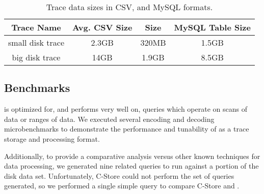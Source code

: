

\begin{table*}[tbh]
\centering
\begin{tabular}{|c|c|c|c|}\hline
Trace Name & Avg. CSV Size & \DataSeries{} Size & MySQL Table Size\\
\hline
small disk trace & 2.3GB & 320MB & 1.5GB\\
big disk trace & 14GB & 1.9GB & 8.5GB \\
\hline
\end{tabular}
\caption{ Trace data sizes in CSV, \DataSeries{} and MySQL formats.}
\label{table:dataSizes}
\end{table*}




\subsection{Benchmarks}\label{sec:perfresults}

\DataSeries{} is optimized for, and performs very well on, queries which
 operate on scans of data or ranges of data.  We executed several
 encoding and decoding microbenchmarks to demonstrate the performance
 and tunability of \DataSeries{} as a trace storage and processing
 format.

Additionally, to provide a comparative analysis versus other known
 techniques for data processing, we generated nine related queries to
 run against a portion of the disk data set.  Unfortunately, C-Store
 could not perform the set of queries generated, so we performed a
 single simple query to compare C-Store and \DataSeries{}.

